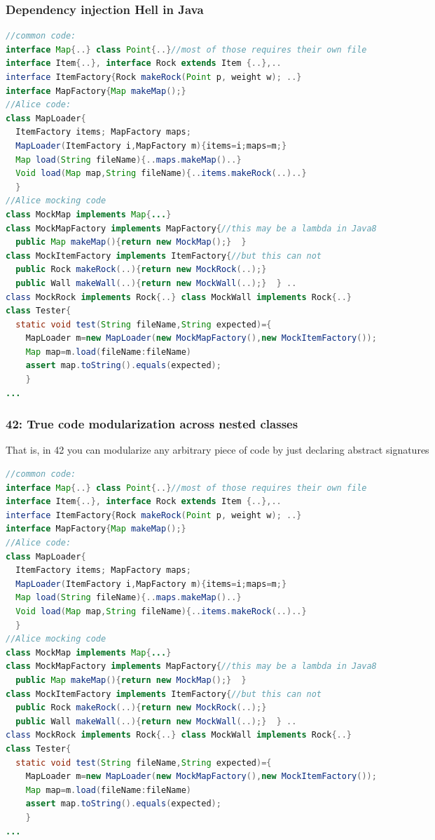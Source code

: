 \begin{frame}[fragile]
\frametitle{Dependency injection Hell in Java}
\begin{NiceCode}{59ex}{0.7}
\begin{lstlisting}[language=Java]
//common code:
interface Map{..} class Point{..}//most of those requires their own file
interface Item{..}, interface Rock extends Item {..},..
interface ItemFactory{Rock makeRock(Point p, weight w); ..}
interface MapFactory{Map makeMap();}
//Alice code:
class MapLoader{
  ItemFactory items; MapFactory maps;
  MapLoader(ItemFactory i,MapFactory m){items=i;maps=m;}
  Map load(String fileName){..maps.makeMap()..}
  Void load(Map map,String fileName){..items.makeRock(..)..}
  }
//Alice mocking code
class MockMap implements Map{...}
class MockMapFactory implements MapFactory{//this may be a lambda in Java8
  public Map makeMap(){return new MockMap();}  }
class MockItemFactory implements ItemFactory{//but this can not
  public Rock makeRock(..){return new MockRock(..);}
  public Wall makeWall(..){return new MockWall(..);}  } ..
class MockRock implements Rock{..} class MockWall implements Rock{..}
class Tester{
  static void test(String fileName,String expected)={
    MapLoader m=new MapLoader(new MockMapFactory(),new MockItemFactory());
    Map map=m.load(fileName:fileName)
    assert map.toString().equals(expected);
    }
...
\end{lstlisting}
\end{NiceCode}
\end{frame}


\begin{frame}[fragile]
\frametitle{42: True code modularization across nested classes}
That is, in 42 you can modularize any arbitrary piece of code by
just declaring abstract signatures 
\begin{NiceCode}{59ex}{0.7}
\begin{lstlisting}[language=Java]
//common code:
interface Map{..} class Point{..}//most of those requires their own file
interface Item{..}, interface Rock extends Item {..},..
interface ItemFactory{Rock makeRock(Point p, weight w); ..}
interface MapFactory{Map makeMap();}
//Alice code:
class MapLoader{
  ItemFactory items; MapFactory maps;
  MapLoader(ItemFactory i,MapFactory m){items=i;maps=m;}
  Map load(String fileName){..maps.makeMap()..}
  Void load(Map map,String fileName){..items.makeRock(..)..}
  }
//Alice mocking code
class MockMap implements Map{...}
class MockMapFactory implements MapFactory{//this may be a lambda in Java8
  public Map makeMap(){return new MockMap();}  }
class MockItemFactory implements ItemFactory{//but this can not
  public Rock makeRock(..){return new MockRock(..);}
  public Wall makeWall(..){return new MockWall(..);}  } ..
class MockRock implements Rock{..} class MockWall implements Rock{..}
class Tester{
  static void test(String fileName,String expected)={
    MapLoader m=new MapLoader(new MockMapFactory(),new MockItemFactory());
    Map map=m.load(fileName:fileName)
    assert map.toString().equals(expected);
    }
...
\end{lstlisting}
\end{NiceCode}
\end{frame}


